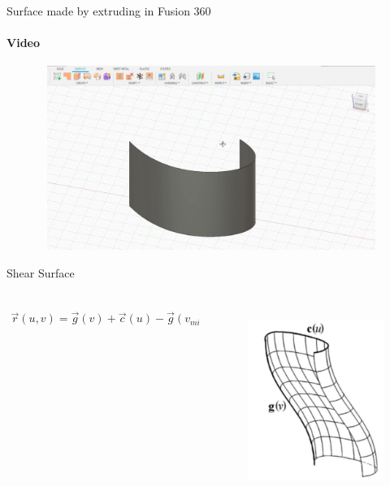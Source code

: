 \documentclass[aspectratio=169]{beamer}
\begin{document}
\begin{frame}[t]{Surface made by extruding in Fusion 360}
    \framesubtitle{Video}
    \vspace{-0.6cm}
    \begin{figure}[H]
        \href{https://disk.yandex.ru/i/38GNopwtFl9wKQ}{
            \centering\includegraphics[height=6cm,width=1\textwidth,keepaspectratio]{extruding_surface_video_preview.jpg}}
    \end{figure}
\end{frame}

\begin{frame}[t]{Shear Surface}
\framesubtitle{}
    \begin{columns}[T,onlytextwidth]
        \begin{column}{0.49\textwidth}
            \begin{align*}
                \vec{r}(u,v) = \vec{g}(v) + \vec{c}(u) - \vec{g}(v_{min})
            \end{align*}
        \end{column}
        \begin{column}{0.49\textwidth}
            \vspace{-0.5cm}
            \begin{figure}[H]
                \centering\includegraphics[height=6cm,width=1\textwidth,keepaspectratio]{shear_surface_book.png}
                \label{fig:shear_surface_book.png}
            \end{figure}
        \end{column}
    \end{columns}
\end{frame}
\end{document}
